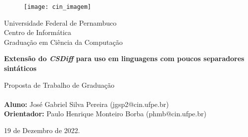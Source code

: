 \begin{figure}[!htpb]
	\centering
	\texttt{[image: cin\_imagem]}
\end{figure}

\vspace{0.5cm}
\begin{center}
	{Universidade Federal de Pernambuco\\
	Centro de Informática\\
	Graduação em Ciência da Computação}
\end{center}
\vspace{2cm}
\begin{center}
	\large{\textbf{Extensão do \emph{CSDiff} para uso em linguagens com poucos separadores sintáticos}}
\end{center}
\vspace{2.5cm}

\begin{center}
Proposta de Trabalho de Graduação \\
    \leavevmode \newline \\
    \textbf{Aluno:} José Gabriel Silva Pereira (jgsp2@cin.ufpe.br) \\
    \leavevmode \newline
    \textbf{Orientador:} Paulo Henrique Monteiro Borba (phmb@cin.ufpe.br) \\
    \leavevmode \newline
\end{center}

\vspace{3cm}
\begin{center}
    19 de Dezembro de 2022.
\end{center}

\thispagestyle{empty}
